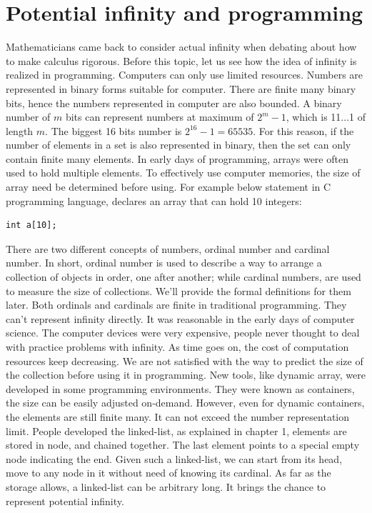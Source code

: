 \documentclass{article}
\begin{document}
\section{Potential infinity and programming}
Mathematicians came back to consider actual infinity when debating about how to make calculus rigorous. Before this topic, let us see how the idea of infinity is realized in programming. Computers can only use limited resources. Numbers are represented in binary forms suitable for computer. There are finite many binary bits, hence the numbers represented in computer are also bounded. A binary number of $m$ bits can represent numbers at maximum of $2^m - 1$, which is 11...1 of length $m$. The biggest 16 bits number is $2^{16} - 1 = 65535$. For this reason, if the number of elements in a set is also represented in binary, then the set can only contain finite many elements. In early days of programming, arrays were often used to hold multiple elements. To effectively use computer memories, the size of array need be determined before using. For example below statement in C programming language, declares an array that can hold 10 integers:

\begin{verbatim}
int a[10];
\end{verbatim}

There are two different concepts of numbers, ordinal number and cardinal number. In short, ordinal number is used to describe a way to arrange a collection of objects in order, one after another; while cardinal numbers, are used to measure the size of collections. We'll provide the formal definitions for them later. Both ordinals and cardinals are finite in traditional programming. They can't represent infinity directly. It was reasonable in the early days of computer science. The computer devices were very expensive, people never thought to deal with practice problems with infinity. As time goes on, the cost of computation resources keep decreasing. We are not satisfied with the way to predict the size of the collection before using it in programming. New tools, like dynamic array, were developed in some programming environments. They were known as containers, the size can be easily adjusted on-demand. However, even for dynamic containers, the elements are still finite many. It can not exceed the number representation limit. People developed the linked-list, as explained in chapter 1, elements are stored in node, and chained together. The last element points to a special empty node indicating the end. Given such a linked-list, we can start from its head, move to any node in it without need of knowing its cardinal. As far as the storage allows, a linked-list can be arbitrary long. It brings the chance to represent potential infinity.
\end{document}
